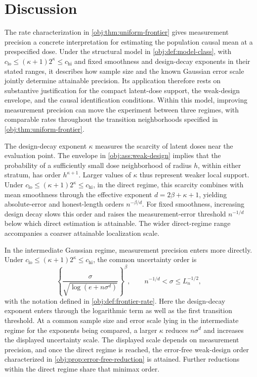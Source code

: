 \section{Discussion}

The rate characterization in \cref{obj:thm:uniform-frontier} gives measurement precision a concrete interpretation for estimating the population causal mean at a prespecified dose. Under the structural model in \cref{obj:def:model-class}, with \(c_{\mathrm{lo}}\le(\kappa+1)2^\kappa\le c_{\mathrm{hi}}\) and fixed smoothness and design-decay exponents in their stated ranges, it describes how sample size and the known Gaussian error scale jointly determine attainable precision. Its application therefore rests on substantive justification for the compact latent-dose support, the weak-design envelope, and the causal identification conditions. Within this model, improving measurement precision can move the experiment between three regimes, with comparable rates throughout the transition neighborhoods specified in \cref{obj:thm:uniform-frontier}.

The design-decay exponent \(\kappa\) measures the scarcity of latent doses near the evaluation point. The envelope in \cref{obj:ass:weak-design} implies that the probability of a sufficiently small dose neighborhood of radius \(h\), within either stratum, has order \(h^{\kappa+1}\). Larger values of \(\kappa\) thus represent weaker local support. Under \(c_{\mathrm{lo}}\le(\kappa+1)2^\kappa\le c_{\mathrm{hi}}\), in the direct regime, this scarcity combines with mean smoothness through the effective exponent \(d=2\beta+\kappa+1\), yielding absolute-error and honest-length orders \(n^{-\beta/d}\). For fixed smoothness, increasing design decay slows this order and raises the measurement-error threshold \(n^{-1/d}\) below which direct estimation is attainable. The wider direct-regime range accompanies a coarser attainable localization scale.

In the intermediate Gaussian regime, measurement precision enters more directly. Under \(c_{\mathrm{lo}}\le(\kappa+1)2^\kappa\le c_{\mathrm{hi}}\), the common uncertainty order is
\[
\left\{\frac{\sigma}{\sqrt{\log(e+n\sigma^d)}}\right\}^{\beta},
\qquad
n^{-1/d}<\sigma\le L_n^{-1/2},
\]
with the notation defined in \cref{obj:def:frontier-rate}. Here the design-decay exponent enters through the logarithmic term as well as the first transition threshold. At a common sample size and error scale lying in the intermediate regime for the exponents being compared, a larger \(\kappa\) reduces \(n\sigma^d\) and increases the displayed uncertainty scale. The displayed scale depends on measurement precision, and once the direct regime is reached, the error-free weak-design order characterized in \cref{obj:prop:error-free-reduction} is attained. Further reductions within the direct regime share that minimax order.

